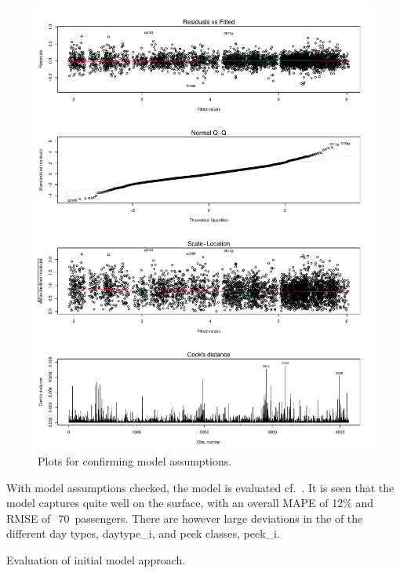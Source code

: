 \documentclass[a4paper,11pt]{article}
\begin{document}
\begin{figure}[!p]
    \center
    \includegraphics[width=\textwidth]{../plots/fit-assumptions}    
    \caption{Plots for confirming model assumptions.}    
    \label{fit-assumptions}
\end{figure}

With model assumptions checked, the model is evaluated cf.\ . It is seen that the model captures quite well on the surface, with an overall MAPE of 12\% and RMSE of\ $~70$~passengers. There are however large deviations in the  of the different {day types}, \gls{daytype_i}, and {peek classes}, \gls{peek_i}.
\begin{table}[!ht]
    \center
    
    \caption{Evaluation of initial model approach.}
    \label{tab:model_all_eval}
\end{table}
\end{document}

